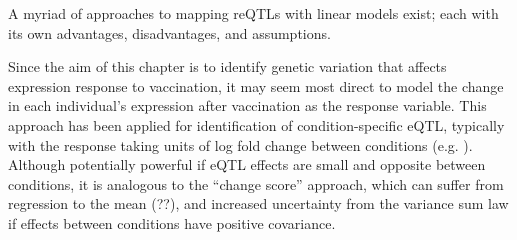 A myriad of approaches to mapping \glspl{reQTL} with linear models exist; each with its own advantages, disadvantages, and assumptions.

Since the aim of this chapter is to identify genetic variation that affects expression response to vaccination, it may seem most direct to model the change in each individual's expression after vaccination as the response variable.
This approach has been applied for identification of condition-specific \gls{eQTL}, typically with the response taking units of log fold change between conditions (e.g. \autocite{maranville2011InteractionsGlucocorticoidTreatment,ackermann2013ImpactNaturalGenetic,shpak2014EQTLAnalysisHuman}).
Although potentially powerful if \gls{eQTL} effects are small and opposite between conditions\autocite{ackermann2013ImpactNaturalGenetic}, 
it is analogous to the \enquote{change score} approach, which can suffer from regression to the mean (??), and increased uncertainty from the variance sum law if effects between conditions have positive covariance\autocite{allison1990ChangeScoresDependent,clifton2019CorrelationBaselineScore}.
%

%
%
%
%
%
%

